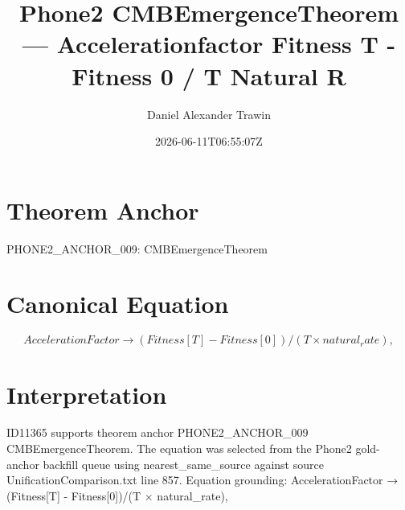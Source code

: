 \documentclass[11pt]{article}
\title{Phone2 CMBEmergenceTheorem — Accelerationfactor Fitness T - Fitness 0 / T Natural R}
\author{Daniel Alexander Trawin}
\date{2026-06-11T06:55:07Z}
\begin{document}
\maketitle
\section*{Theorem Anchor}
PHONE2_ANCHOR_009: CMBEmergenceTheorem
\section*{Canonical Equation}
\[
AccelerationFactor → (Fitness[T] - Fitness[0])/(T × natural_rate),
\]
\section*{Interpretation}
ID11365 supports theorem anchor PHONE2_ANCHOR_009 CMBEmergenceTheorem. The equation was selected from the Phone2 gold-anchor backfill queue using nearest_same_source against source UnificationComparison.txt line 857. Equation grounding: AccelerationFactor → (Fitness[T] - Fitness[0])/(T × natural_rate),
\end{document}
